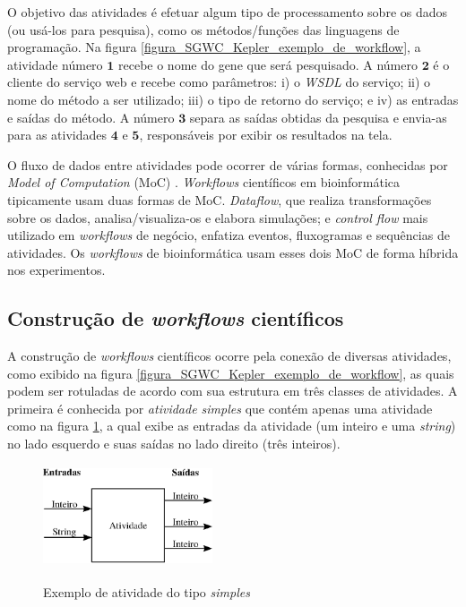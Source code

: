 O objetivo das atividades é efetuar algum tipo de processamento sobre os dados (ou usá-los para pesquisa), como os métodos/funções das linguagens de programação. Na figura \ref{figura_SGWC_Kepler_exemplo_de_workflow}, a atividade número \(\mathbf{1}\) recebe o nome do gene que será pesquisado. A número \(\mathbf{2}\) é o cliente do serviço web e recebe como parâmetros: i) o \emph{WSDL} do serviço; ii) o nome do método a ser utilizado; iii) o tipo de retorno do serviço; e iv) as entradas e saídas do método. A número \(\mathbf{3}\) separa as saídas obtidas da pesquisa e envia-as para as atividades \(\mathbf{4}\) e \(\mathbf{5}\), responsáveis por exibir os resultados na tela.

O fluxo de dados entre atividades pode ocorrer de várias formas, conhecidas por \emph{Model of Computation} (MoC) \cite{Ludascher2006}. \emph{Workflows} científicos em bioinformática tipicamente usam duas formas de MoC. \emph{Dataflow}, que realiza transformações sobre os dados, analisa/visualiza-os e elabora simulações; e \emph{control flow} mais utilizado em \emph{workflows} de negócio, enfatiza eventos, fluxogramas e sequências de atividades. Os \emph{workflows} de bioinformática usam esses dois MoC de forma híbrida nos experimentos.

\subsection{Construção de \emph{workflows} científicos}\label{SEC_CONSTRUCAO_WORKFLOWS_CIENTIFICOS}
A construção de \emph{workflows} científicos ocorre pela conexão de diversas atividades, como exibido na figura \ref{figura_SGWC_Kepler_exemplo_de_workflow}, as quais podem ser rotuladas de acordo com sua estrutura em três classes de atividades. A primeira é conhecida por \emph{atividade simples} que contém apenas uma atividade \cite{Garijo2014} como na figura \ref{figura_atividade_simples}, a qual exibe as entradas da atividade (um inteiro e uma \emph{string}) no lado esquerdo e suas saídas no lado direito (três inteiros).
\begin{figure}[!htp]
    \centering  
    \caption{Exemplo de atividade do tipo \emph{simples}}
    \includegraphics[width=5cm,height=3cm]{./secoes/conceitosFundamentais/pics/img/Atividade.eps}    
	\label{figura_atividade_simples}
	\vspace{0.1cm}
	\source{\varAutorData}
\end{figure}

